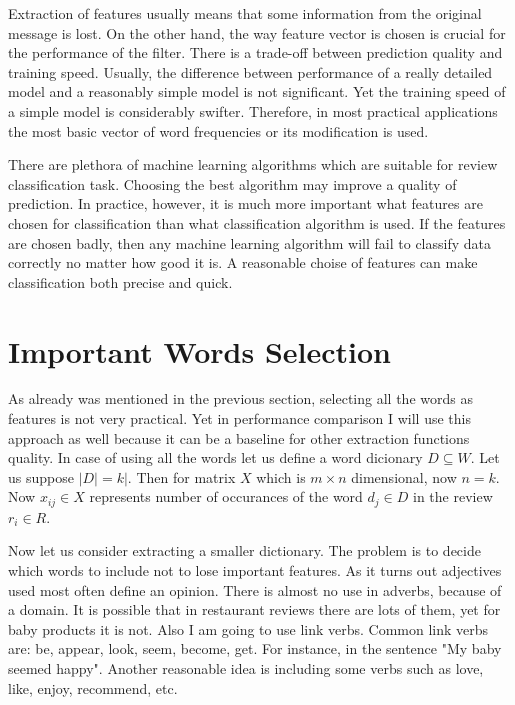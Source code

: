 \documentclass[12pt]{report}
\begin{document}
Extraction of features usually means that some information from the original message is lost. On the other hand, the way feature vector is chosen is crucial for the performance of the filter. There is a trade-off between prediction quality and training speed. Usually, the difference between performance of a really detailed model and a reasonably simple model is not significant. Yet the training speed of a simple model is considerably swifter. Therefore, in most practical applications the most basic vector of word frequencies or its modification is used.

There are plethora of machine learning algorithms which are suitable for review classification task. Choosing the best algorithm may improve a quality of prediction. In practice, however, it is much more important what features are chosen for classification than what classification algorithm is used. If the features are chosen badly, then any machine learning algorithm will fail to classify data correctly no matter how good it is. A reasonable choise of features can make classification both precise and quick.

\newpage

\section{Important Words Selection}

As already was mentioned in the previous section, selecting all the words as features is not very practical. Yet in performance comparison I will use this approach as well because it can be a baseline for other extraction functions quality. In case of using all the words let us define a word dicionary $D \subseteq W$. Let us suppose $|D| = k|$. Then for matrix $X$ which is $m \times n$ dimensional, now $n = k$. Now $x_{ij} \in X$ represents number of occurances of the word $d_j \in D$ in the review $r_i \in R$.

Now let us consider extracting a smaller dictionary. The problem is to decide which words to include not to lose important features. As it turns out adjectives used most often define an opinion. There is almost no use in adverbs, because of a domain. It is possible that in restaurant reviews there are lots of them, yet for baby products it is not.  Also I am going to use link verbs. Common link verbs are: be, appear, look, seem, become, get. For instance, in the sentence "My baby seemed happy". Another reasonable idea is including some verbs such as love, like, enjoy, recommend, etc.
\end{document}
